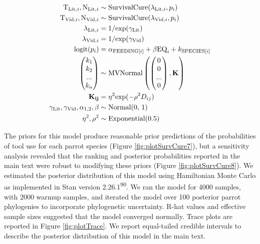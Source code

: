\documentclass[
  man, donotrepeattitle,floatsintext]{apa6}
\begin{document}
\begin{align}
\text{T}_{\text{Lit},i}, \text{N}_{\text{Lit},i} &\sim \text{SurvivalCure}(\lambda_{\text{Lit},i}, p_{i}) \\
\text{T}_{\text{Vid},i}, \text{N}_{\text{Vid},i} &\sim \text{SurvivalCure}(\lambda_{\text{Vid},i}, p_{i}) \nonumber \\
\lambda_{\text{Lit},i} &= 1 / \text{exp}(\gamma_\text{Lit}) \nonumber \\
\lambda_{\text{Vid},i} &= 1 / \text{exp}(\gamma_\text{Vid}) \nonumber \\
\text{logit}(p_{i}) &= \alpha_{\text{FEEDING}[i]} + \beta\text{EQ}_{i} +  k_{\text{SPECIES}[i]} \nonumber \\
\begin{pmatrix}k_{1}\\k_{2}\\...\\k_{n}\\\end{pmatrix}
&\sim \text{MVNormal}
\begin{pmatrix}\begin{pmatrix}0\\0\\...\\0\\\end{pmatrix},\bf{K}\end{pmatrix} \nonumber \\
\bf{K}_{ij} &= \eta^2\text{exp}(-\rho^2D_{ij}) \nonumber \\
\gamma_\text{Lit}, \gamma_\text{Vid}, \alpha_{1,2}, \beta &\sim \text{Normal(0, 1)} \nonumber \\
\eta^2, \rho^2 &\sim \text{Exponential(0.5)} \nonumber
\end{align}

The priors for this model produce reasonable prior predictions of the
probabilities of tool use for each parrot species (Figure
\ref{fig:plotSurvCure7}), but a sensitivity analysis revealed that the ranking
and posterior probabilities reported in the main text were robust to modifying
these priors (Figure \ref{fig:plotSurvCure8}). We estimated the
posterior distribution of this model using Hamiltonian Monte Carlo as
implemented in Stan version 2.26.1\textsuperscript{90}. We ran the model for 4000
samples, with 2000 warmup samples, and iterated the model over 100 posterior
parrot phylogenies to incorporate phylogenetic uncertainty. R-hat values and
effective sample sizes suggested that the model converged normally. Trace plots
are reported in Figure \ref{fig:plotTrace}. We report
equal-tailed credible intervals to describe the posterior distribution of this
model in the main text.
\end{document}
